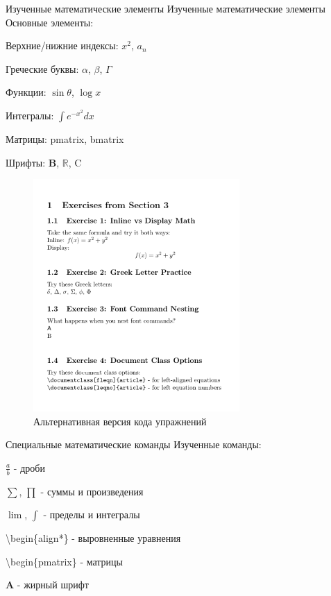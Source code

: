 \begin{frame}{Изученные математические элементы}
\label{ux438ux437ux443ux447ux435ux43dux43dux44bux435-ux43cux430ux442ux435ux43cux430ux442ux438ux447ux435ux441ux43aux438ux435-ux44dux43bux435ux43cux435ux43dux442ux44b}
Изученные математические элементы Основные элементы:

Верхние/нижние индексы: \(x^2\), \(a_n\)

Греческие буквы: \(\alpha\), \(\beta\), \(\Gamma\)

Функции: \(\sin\theta\), \(\log x\)

Интегралы: \(\int e^{-x^2} dx\)

Матрицы: pmatrix, bmatrix

Шрифты: \(\mathbf{B}\), \(\mathbb{R}\), \(\mathrm{C}\)

\begin{figure}
\centering
\includegraphics[width=0.7\textwidth,height=\textheight]{image_07.jpg}
\caption{Альтернативная версия кода упражнений}
\end{figure}
\end{frame}

\begin{frame}{Специальные математические команды}
\label{ux441ux43fux435ux446ux438ux430ux43bux44cux43dux44bux435-ux43cux430ux442ux435ux43cux430ux442ux438ux447ux435ux441ux43aux438ux435-ux43aux43eux43cux430ux43dux434ux44b}
Изученные команды:

\(\frac{a}{b}\) - дроби

\(\sum\), \(\prod\) - суммы и произведения

\(\lim\), \(\int\) - пределы и интегралы

\textbackslash begin\{align*\} - выровненные уравнения

\textbackslash begin\{pmatrix\} - матрицы

\(\mathbf{A}\) - жирный шрифт
\end{frame}

